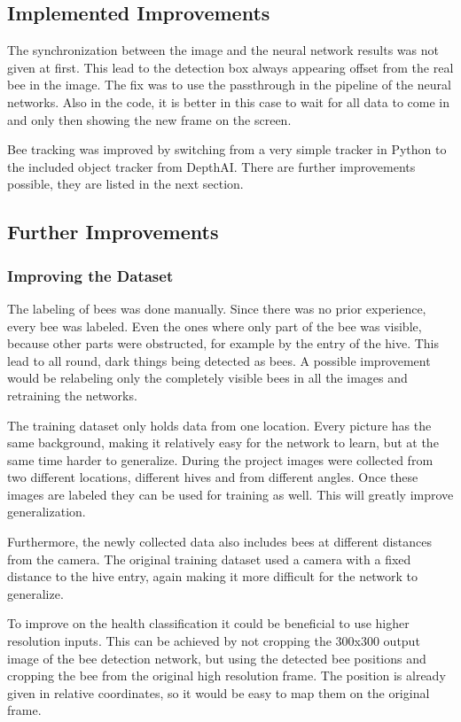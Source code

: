 \documentclass[a4paper,titlepage]{article}
\begin{document}
\subsection{Implemented Improvements}

The synchronization between the image and the neural network results was not given at first.
This lead to the detection box always appearing offset from the real bee in the image.
The fix was to use the passthrough in the pipeline of the neural networks.
Also in the code, it is better in this case to wait for all data to come in and only then showing the new frame on the screen.

Bee tracking was improved by switching from a very simple tracker in Python to the included object tracker from DepthAI.
There are further improvements possible, they are listed in the next section.

\subsection{Further Improvements}

\subsubsection{Improving the Dataset}

The labeling of bees was done manually.
Since there was no prior experience, every bee was labeled.
Even the ones where only part of the bee was visible, because other parts were obstructed, for example by the entry of the hive.
This lead to all round, dark things being detected as bees.
A possible improvement would be relabeling only the completely visible bees in all the images and retraining the networks.

The training dataset only holds data from one location.
Every picture has the same background, making it relatively easy for the network to learn, but at the same time harder to generalize.
During the project images were collected from two different locations, different hives and from different angles.
Once these images are labeled they can be used for training as well.
This will greatly improve generalization.

Furthermore, the newly collected data also includes bees at different distances from the camera.
The original training dataset used a camera with a fixed distance to the hive entry, again making it more difficult for the network to generalize.

To improve on the health classification it could be beneficial to use higher resolution inputs.
This can be achieved by not cropping the 300x300 output image of the bee detection network, but using the detected bee positions and cropping the bee from the original high resolution frame.
The position is already given in relative coordinates, so it would be easy to map them on the original frame.
\end{document}
